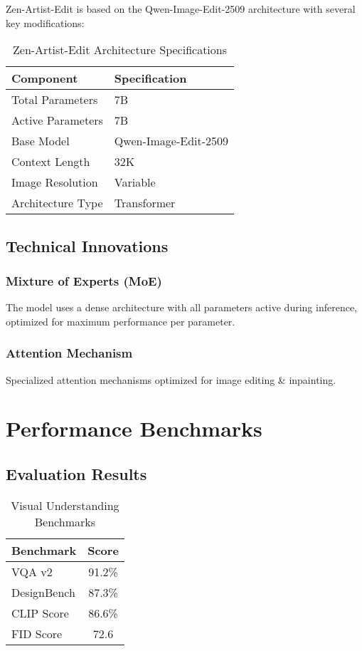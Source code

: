 \documentclass[11pt,a4paper]{article}
\begin{document}
Zen-Artist-Edit is based on the Qwen-Image-Edit-2509 architecture with several key modifications:

\begin{table}[H]
\centering
\begin{tabular}{ll}
\toprule
\textbf{Component} & \textbf{Specification} \\
\midrule
Total Parameters & 7B \\
Active Parameters & 7B \\
Base Model & Qwen-Image-Edit-2509 \\
Context Length & 32K \\

Image Resolution & Variable \\

Architecture Type & Transformer \\
\bottomrule
\end{tabular}
\caption{Zen-Artist-Edit Architecture Specifications}
\end{table}

\subsection{Technical Innovations}

\subsubsection{Mixture of Experts (MoE)}
The model uses a dense architecture with all parameters active during inference, optimized for maximum performance per parameter.

\subsubsection{Attention Mechanism}
Specialized attention mechanisms optimized for image editing & inpainting.



\section{Performance Benchmarks}

\subsection{Evaluation Results}


\begin{table}[H]
\centering
\begin{tabular}{lc}
\toprule
\textbf{Benchmark} & \textbf{Score} \\
\midrule
VQA v2 & 91.2\% \\
DesignBench & 87.3\% \\
CLIP Score & 86.6\% \\
FID Score & 72.6 \\
\bottomrule
\end{tabular}
\caption{Visual Understanding Benchmarks}
\end{table}
\end{document}
